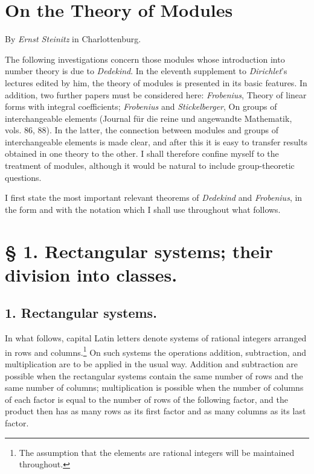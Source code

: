 \section*{On the Theory of Modules}
\begin{center}
By \emph{Ernst Steinitz} in Charlottenburg.
\end{center}

The following investigations concern those modules whose introduction into number theory is due to \emph{Dedekind}. In the eleventh supplement to \emph{Dirichlet}'s lectures edited by him, the theory of modules is presented in its basic features. In addition, two further papers must be considered here: \emph{Frobenius}, Theory of linear forms with integral coefficients; \emph{Frobenius} and \emph{Stickelberger}, On groups of interchangeable elements (Journal für die reine und angewandte Mathematik, vols. 86, 88). In the latter, the connection between modules and groups of interchangeable elements is made clear, and after this it is easy to transfer results obtained in one theory to the other. I shall therefore confine myself to the treatment of modules, although it would be natural to include group-theoretic questions.

I first state the most important relevant theorems of \emph{Dedekind} and \emph{Frobenius}, in the form and with the notation which I shall use throughout what follows.

\section*{§ 1. Rectangular systems; their division into classes.}

\subsection*{1. Rectangular systems.}

In what follows, capital Latin letters denote systems of rational integers arranged in rows and columns.\footnote{The assumption that the elements are rational integers will be maintained throughout.} On such systems the operations addition, subtraction, and multiplication are to be applied in the usual way. Addition and subtraction are possible when the rectangular systems contain the same number of rows and the same number of columns; multiplication is possible when the number of columns of each factor is equal to the number of rows of the following factor, and the product then has as many rows as its first factor and as many columns as its last factor.

